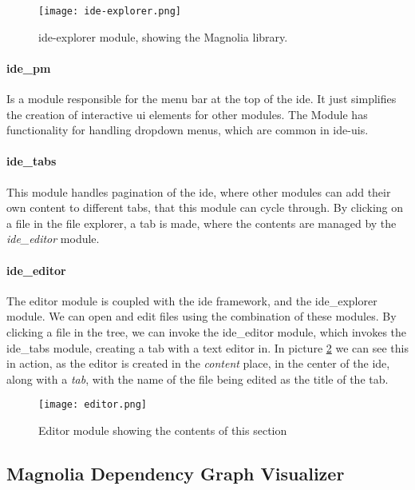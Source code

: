 \begin{figure}[H]
  \centering
  \texttt{[image: ide-explorer.png]}
  \caption{
    \gls*{ide}-explorer module, showing the Magnolia library.
  }
  \label{pic:ideEx}
\end{figure}


\paragraph{ide\_pm} Is a module responsible for the menu bar at the top of the
\gls*{ide}. It just simplifies the creation of interactive \gls*{ui} elements
for other modules. The Module has functionality for handling dropdown menus,
which are common in \gls*{ide}-\gls*{ui}s.

\paragraph{ide\_tabs} This module handles pagination of the \gls*{ide}, where
other modules can add their own content to different tabs, that this module can
cycle through. By clicking on a file in the file explorer, a tab is made, where
the contents are managed by the \textit{ide\_editor} module.

\paragraph{ide\_editor} The editor module is coupled with the \gls*{ide}
framework, and the ide\_explorer module. We can open and edit files using the
combination of these modules. By clicking a file in the tree, we can invoke the
ide\_editor module, which invokes the ide\_tabs module, creating a tab with a
text editor in. In picture \ref{pic:editorModule} we can see this in action, as
the editor is created in the \textit{content} place, in the center of the
\gls*{ide}, along with a \textit{tab}, with the name of the file being edited as
the title of the tab.

\begin{figure}[H]
  \centering
  \texttt{[image: editor.png]}
  \caption{
    Editor module showing the contents of this section
  }
  \label{pic:editorModule}
\end{figure}


\subsection{Magnolia Dependency Graph Visualizer}

